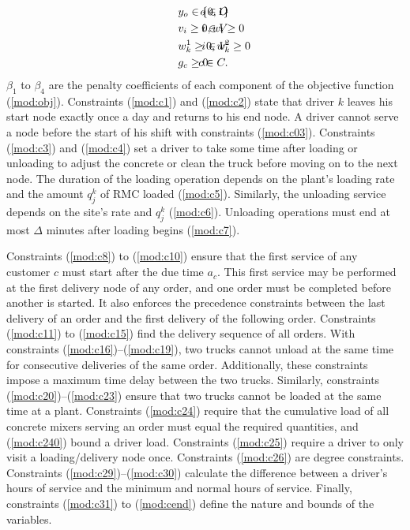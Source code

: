 \documentclass[]{article}
\begin{document}
{\begin{alignat}{3}
    \label{mod:c36}        & y_o \in \{0,1\}     & \hspace{-20mm}  o \in O            \text{ }                     \\
    \label{mod:c37}        & v_i \geq 0,  w_i \geq 0     & \hspace{-20mm}  i \in V         \text{ }                \\
    \label{mod:c38}        & w^1_{k} \geq 0,  w^2_k \geq 0  & \hspace{-20mm}  i \in V         \text{ }        \\
    \label{mod:cend}       & g_c \geq 0    & \hspace{-20mm}  c \in C.  \text{ }
\end{alignat}
}
$\beta_1$ to $\beta_4$ are the penalty coefficients of each component of the objective function (\ref{mod:obj}). Constraints (\ref{mod:c1}) and (\ref{mod:c2}) state that driver $k$ leaves his start node exactly once a day and returns to his end node. A driver cannot serve a node before the start of his shift with constraints (\ref{mod:c03}). Constraints (\ref{mod:c3}) and (\ref{mod:c4}) set a driver to take some time after loading or unloading to adjust the concrete or clean the truck before moving on to the next node. The duration of the loading operation depends on the plant's loading rate and the amount $q^k_j$ of RMC loaded (\ref{mod:c5}). Similarly, the unloading service depends on the site's rate and $q^k_j$ (\ref{mod:c6}). Unloading operations must end at most $\Delta$ minutes after loading begins (\ref{mod:c7}).

Constraints (\ref{mod:c8}) to (\ref{mod:c10}) ensure that the first service of any customer $c$ must start after the due time $a_c$. This first service may be performed at the first delivery node of any order, and one order must be completed before another is started. It also enforces the precedence constraints between the last delivery of an order and the first delivery of the following order. Constraints (\ref{mod:c11}) to (\ref{mod:c15}) find the delivery sequence of all orders. With constraints (\ref{mod:c16})--(\ref{mod:c19}), two trucks cannot unload at the same time for consecutive deliveries of the same order. Additionally, these constraints impose a maximum time delay between the two trucks. Similarly, constraints (\ref{mod:c20})--(\ref{mod:c23}) ensure that two trucks cannot be loaded at the same time at a plant. Constraints (\ref{mod:c24}) require that the cumulative load of all concrete mixers serving an order must equal the required quantities, and (\ref{mod:c240}) bound a driver load. Constraints (\ref{mod:c25}) require a driver to only visit a loading/delivery node once. Constraints (\ref{mod:c26}) are degree constraints. Constraints (\ref{mod:c29})--(\ref{mod:c30}) calculate the difference between a driver's hours of service and the minimum and normal hours of service. Finally, constraints (\ref{mod:c31}) to (\ref{mod:cend}) define the nature and bounds of the variables.
\end{document}
